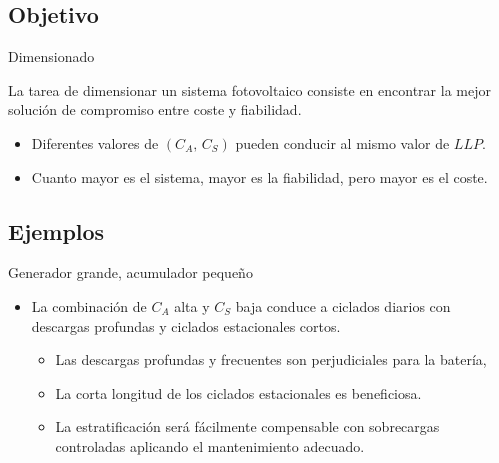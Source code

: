 \documentclass[xcolor={usenames,svgnames,dvipsnames}]{beamer}
\begin{document}
\subsection{Objetivo}
\label{sec:org2d2415d}
\begin{frame}[label={sec:org3a4ba04}]{Dimensionado}
\begin{block}{La tarea de dimensionar un sistema fotovoltaico consiste en encontrar la mejor solución de compromiso entre coste y fiabilidad.}
\begin{itemize}
\item Diferentes valores de \((C_{A},\, C_{S})\) pueden conducir al mismo
valor de \(LLP\).

\item Cuanto mayor es el sistema, mayor es la fiabilidad, pero mayor es el
coste.
\end{itemize}
\end{block}
\end{frame}


\subsection{Ejemplos}
\label{sec:org323c0b7}
\begin{frame}[label={sec:org9c78e01}]{Generador grande, acumulador pequeño}
\begin{itemize}
\item La \alert{combinación de \(C_{A}\) alta y \(C_{S}\) baja} conduce a ciclados
diarios con descargas profundas y ciclados estacionales
cortos.

\begin{itemize}
\item Las descargas profundas y frecuentes son perjudiciales para la
batería,

\item La corta longitud de los ciclados estacionales es beneficiosa.

\item La estratificación será fácilmente compensable con sobrecargas
controladas aplicando el mantenimiento adecuado.
\end{itemize}
\end{itemize}
\end{frame}
\end{document}
